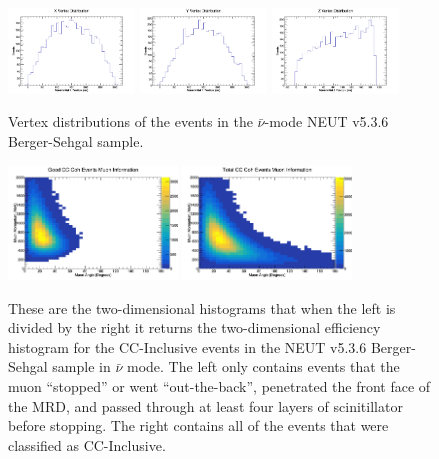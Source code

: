 \documentclass[11pt]{article}
\begin{document}
\begin{figure}[H]
\centering
\includegraphics[width=0.3\textwidth]{NewANMBergerSehgalImages/4-XVertexDistributionANMBS.png}
\includegraphics[width=0.3\textwidth]{NewANMBergerSehgalImages/3-YVertexDistributionANMBS.png}
\includegraphics[width=0.3\textwidth]{NewANMBergerSehgalImages/2-ZVertexDistributionANMBS.png}
\caption{Vertex distributions of the events in the $\bar{\nu}$-mode NEUT v5.3.6 Berger-Sehgal sample.}
\label{fig:app:ANMVertexDistributionBS}
\end{figure}

\begin{figure}[H]
\centering
\includegraphics[width=0.4\textwidth]{NewANMBergerSehgalImages/6-GoodCCCohMuonInfoANMBS.png}
\includegraphics[width=0.4\textwidth]{NewANMBergerSehgalImages/9-TotalCCCohMuonInfoANMBS.png}
\caption{These are the two-dimensional histograms that when the left is divided by the right it returns the two-dimensional efficiency histogram for the CC-Inclusive events in the NEUT v5.3.6 Berger-Sehgal sample in $\bar{\nu}$ mode. The left only contains events that the muon ``stopped'' or went ``out-the-back'', penetrated the front face of the MRD, and passed through at least four layers of scinitillator before stopping. The right contains all of the events that were classified as CC-Inclusive.}
\label{fig:app:ANMCCInclusiveMuon2DBS}
\end{figure}
\end{document}
